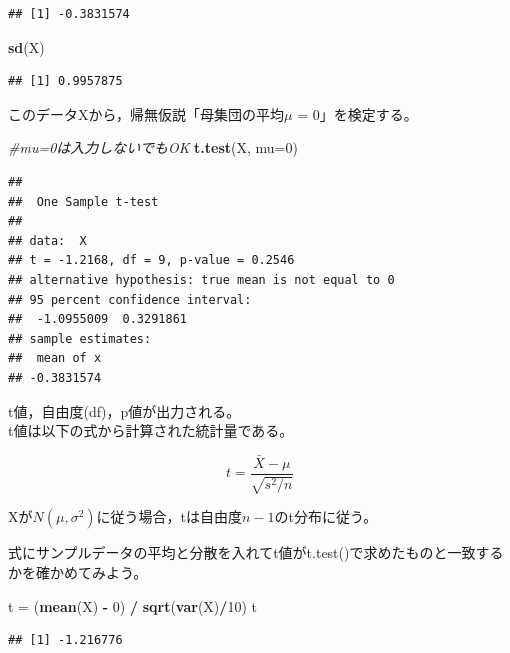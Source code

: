 \documentclass[]{article}
\newenvironment{Shaded}{\begin{snugshade}}{\end{snugshade}}
\newcommand{\KeywordTok}[1]{\textcolor[rgb]{0.13,0.29,0.53}{\textbf{#1}}}
\newcommand{\DataTypeTok}[1]{\textcolor[rgb]{0.13,0.29,0.53}{#1}}
\newcommand{\DecValTok}[1]{\textcolor[rgb]{0.00,0.00,0.81}{#1}}
\newcommand{\StringTok}[1]{\textcolor[rgb]{0.31,0.60,0.02}{#1}}
\newcommand{\CommentTok}[1]{\textcolor[rgb]{0.56,0.35,0.01}{\textit{#1}}}
\newcommand{\OperatorTok}[1]{\textcolor[rgb]{0.81,0.36,0.00}{\textbf{#1}}}
\newcommand{\NormalTok}[1]{#1}
\begin{document}
\begin{verbatim}
## [1] -0.3831574
\end{verbatim}

\begin{Shaded}
\begin{Highlighting}[]
\KeywordTok{sd}\NormalTok{(X)}
\end{Highlighting}
\end{Shaded}

\begin{verbatim}
## [1] 0.9957875
\end{verbatim}

このデータXから，帰無仮説「母集団の平均\(\mu\) = 0」を検定する。

\begin{Shaded}
\begin{Highlighting}[]
\CommentTok{#mu=0は入力しないでもOK}
\KeywordTok{t.test}\NormalTok{(X, }\DataTypeTok{mu=}\DecValTok{0}\NormalTok{)}
\end{Highlighting}
\end{Shaded}

\begin{verbatim}
## 
##  One Sample t-test
## 
## data:  X
## t = -1.2168, df = 9, p-value = 0.2546
## alternative hypothesis: true mean is not equal to 0
## 95 percent confidence interval:
##  -1.0955009  0.3291861
## sample estimates:
##  mean of x 
## -0.3831574
\end{verbatim}

t値，自由度(df)，p値が出力される。\\
t値は以下の式から計算された統計量である。

\[
t = \frac{\bar{X} - \mu}{\sqrt{s^2/n}}
\]

Xが\(N(\mu, \sigma^2)\)に従う場合，tは自由度\(n-1\)のt分布に従う。

式にサンプルデータの平均と分散を入れてt値がt.test()で求めたものと一致するかを確かめてみよう。

\begin{Shaded}
\begin{Highlighting}[]
\NormalTok{t =}\StringTok{ }\NormalTok{(}\KeywordTok{mean}\NormalTok{(X) }\OperatorTok{-}\StringTok{ }\DecValTok{0}\NormalTok{) }\OperatorTok{/}\StringTok{ }\KeywordTok{sqrt}\NormalTok{(}\KeywordTok{var}\NormalTok{(X)}\OperatorTok{/}\DecValTok{10}\NormalTok{)}
\NormalTok{t}
\end{Highlighting}
\end{Shaded}

\begin{verbatim}
## [1] -1.216776
\end{verbatim}
\end{document}
